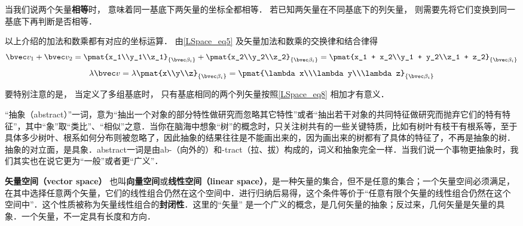 当我们说两个矢量\textbf{相等}时， 意味着同一基底下两矢量的坐标全都相等． 若已知两矢量在不同基底下的列矢量， 则需要先将它们变换到同一基底下再判断是否相等．

以上介绍的加法和数乘都有对应的坐标运算． 由\autoref{LSpace_eq5} 及矢量加法和数乘的交换律和结合律得
\begin{equation}\label{LSpace_eq8}
\bvec v_1 + \bvec v_2 = \pmat{x_1\\y_1\\z_1}_{\{\bvec\beta_i\}} + \pmat{x_2\\y_2\\z_2}_{\{\bvec\beta_i\}} = \pmat{x_1 + x_2\\y_1 + y_2\\z_1 + z_2}_{\{\bvec\beta_i\}}
\end{equation}
\begin{equation}\label{LSpace_eq9}
\lambda \bvec v = \lambda\pmat{x\\y\\z}_{\{\bvec\beta_i\}} = \pmat{\lambda x\\\lambda y\\\lambda z}_{\{\bvec\beta_i\}}
\end{equation}

要特别注意的是， 当定义了多组基底时， 只有基底相同的两个列矢量按照\autoref{LSpace_eq8} 相加才有意义．









“抽象（abstract）”一词，意为“抽出一个对象的部分特性做研究而忽略其它特性”或者“抽出若干对象的共同特征做研究而抛弃它们的特有特征”，其中“象”取“类比”、“相似”之意．当你在脑海中想象“树”的概念时，只关注树共有的一些关键特质，比如有树叶有枝干有根系等，至于具体多少树叶、根系如何分布则被忽略了，因此抽象的结果往往是不能画出来的，因为画出来的树都有了具体的特征了，不再是抽象的树．抽象的对立面，是具象．abstract一词是由ab-（向外的）和-tract（拉、拔）构成的，词义和抽象完全一样．当我们说一个事物更抽象时，我们其实也在说它更为“一般”或者更“广义”．

\textbf{矢量空间（vector space）} 也叫\textbf{向量空间}或\textbf{线性空间（linear space）}，是一种矢量的集合，但不是任意的集合；一个矢量空间必须满足，在其中选择任意两个矢量，它们的线性组合仍然在这个空间中．进行归纳后易得，这个条件等价于“任意有限个矢量的线性组合仍然在这个空间中”．这个性质被称为矢量线性组合的\textbf{封闭性}．这里的“矢量” 是一个广义的概念，是几何矢量的抽象；反过来，几何矢量是矢量的具象．一个矢量，不一定具有长度和方向．



